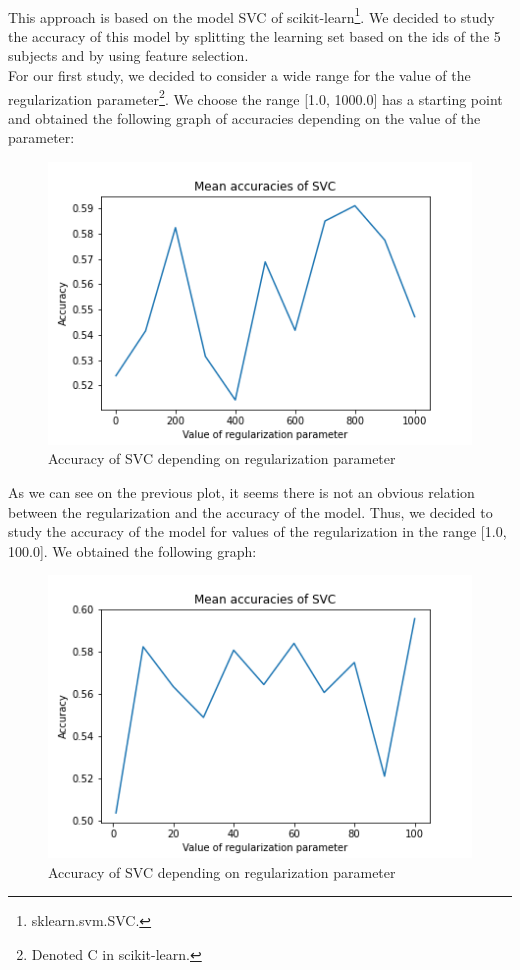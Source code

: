 \documentclass[a4paper, 11pt, oneside]{article}
\begin{document}
\paragraph{}This approach is based on the model SVC of scikit-learn\footnote{sklearn.svm.SVC.}. We decided to study the accuracy of this model by splitting the learning set based on the ids of the 5 subjects and by using feature selection.\\
For our first study, we decided to consider a wide range for the value of the regularization parameter\footnote{Denoted C in scikit-learn.}. We choose the range [1.0, 1000.0] has a starting point and obtained the following graph of accuracies depending on the value of the parameter:
\begin{figure}[H]
\centering
\includegraphics[scale=0.4]{svm/svm_svc_accuracies_1.png}
\caption{Accuracy of SVC depending on regularization parameter}
\end{figure}
As we can see on the previous plot, it seems there is not an obvious relation between the regularization and the accuracy of the model. Thus, we decided to study the accuracy of the model for values of the regularization in the range [1.0, 100.0]. We obtained the following graph:
\begin{figure}[H]
\centering
\includegraphics[scale=0.4]{svm/svm_svc_accuracies_2.png}
\caption{Accuracy of SVC depending on regularization parameter}
\end{figure}
\end{document}
